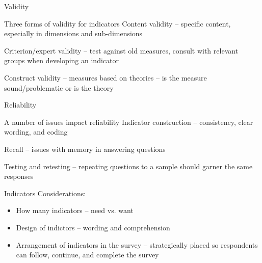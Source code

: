 \documentclass[slidestop,compress,mathserif,12pt,t,professionalfonts,xcolor=table]{beamer}
\begin{document}
\begin{frame}{
Validity}

Three forms of validity for indicators
Content validity – specific content, especially in dimensions and sub-dimensions 


Criterion/expert validity – test against old measures, consult with relevant groups when developing an indicator 


Construct validity – measures based on theories – is the measure sound/problematic or is the theory

\end{frame}

\begin{frame}{
Reliability}

A number of issues impact reliability
Indicator construction – consistency, clear wording, and coding


Recall – issues with memory in answering questions


Testing and retesting – repeating questions to a sample should garner the same responses  

\end{frame}

\begin{frame}{
Indicators}
Considerations: 

\begin{itemize}

\item How many indicators – need vs. want 
\item Design of indictors – wording and comprehension
\item Arrangement of indicators in the survey – strategically placed so respondents can follow, continue, and complete the survey 

\end{itemize}

\end{frame}

\end{document}
